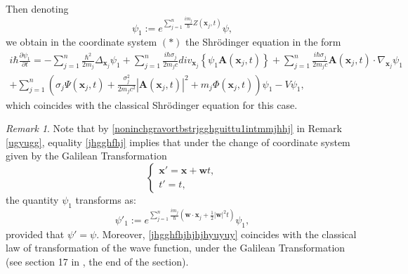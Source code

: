\documentclass{article}
\theoremstyle{definition}
\theoremstyle{remark}
\newtheorem{remark}{Remark}[section]
\renewcommand{\vec}[1]{\mathbf{#1}}
\newcommand{\er}{\eqref}
\newcommand{\er}{\eqref}
\newtheorem{remark}{Remark}
\begin{document}
Then denoting
\begin{equation}\label{jhgghfhj}
\psi_1:=e^{\sum_{j=1}^{n}\frac{im_j}{\hbar}Z(\vec x_j,t)}\psi,
\end{equation}
we obtain in the
coordinate system $(*)$ the Shr\"{o}dinger equation in the form
\begin{multline}\label{vhfffngghkjgghfjjghghghhjghjgghkghgghjhggjjkgfgdiyfgfjkjgjggjjgugyyjjkgghgjjhhjkkhjhjkSYSPN}
i\hbar\frac{\partial\psi_1}{\partial
t}=-\sum_{j=1}^{n}\frac{\hbar^2}{2m_j}\Delta_{\vec
x_j}\psi_1+\sum_{j=1}^{n}\frac{ i\hbar\sigma_j}{2m_jc}div_{\vec
x_j}\left\{\psi_1\vec A(\vec x_j,t)\right\}
+\sum_{j=1}^{n}\frac{ i\hbar\sigma_j}{2m_jc}\vec A(\vec
x_j,t)\cdot\nabla_{\vec x_j}\psi_1
\\+\sum_{j=1}^{n}\left(\sigma_j\Psi(\vec
x_j,t)+\frac{\sigma^2_j}{2m_jc^2}\left|\vec A(\vec
x_j,t)\right|^2+m_j\Phi(\vec x_j,t)\right)\psi_1-V\psi_1,
\end{multline}
which coincides with the classical Shr\"{o}dinger equation for this
case.
\begin{remark}\label{gyytghffg}
Note that by \er{noninchgravortbstrjgghguittu1intmmjhhj} in Remark
\ref{ugyugg}, equality \er{jhgghfhj} implies that under the change
of coordinate system given by the Galilean Transformation
\begin{equation}\label{noninchgravortbstrjgghguittu1intmmkuk}
\begin{cases}
\vec x'=\vec x+\vec wt,\\
t'=t,
\end{cases}
\end{equation}
the quantity $\psi_1$ transforms as:
\begin{equation}\label{jhgghfhjhjhjhyuyuy}
\psi'_1:=e^{\sum_{j=1}^{n}\frac{im_j}{\hbar}(\vec w\cdot\vec
x_j+\frac{1}{2}|\vec w|^2t)}\psi_1,
\end{equation}
provided that $\psi'=\psi$. Moreover, \er{jhgghfhjhjhjhyuyuy}
coincides with the classical law of transformation of the wave
function, under the Galilean Transformation (see section 17 in
\cite{LL}, the end of the section).
\end{remark}
\end{document}
